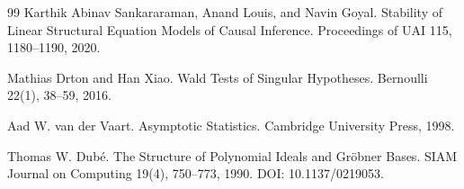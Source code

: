 \documentclass{article}
\begin{document}
\begin{thebibliography}{99}
   Karthik Abinav Sankararaman, Anand Louis, and Navin Goyal. Stability of Linear Structural Equation Models of Causal Inference. Proceedings of UAI 115, 1180--1190, 2020.

   Mathias Drton and Han Xiao. Wald Tests of Singular Hypotheses. Bernoulli 22(1), 38--59, 2016.

   Aad W. van der Vaart. Asymptotic Statistics. Cambridge University Press, 1998.

   Thomas W. Dubé. The Structure of Polynomial Ideals and Gröbner Bases. SIAM Journal on Computing 19(4), 750--773, 1990. DOI: 10.1137/0219053.

\end{thebibliography}
\end{document}
